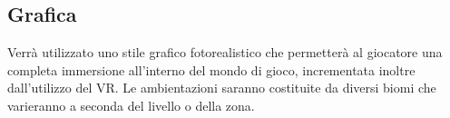 \documentclass[12pt]{report}
\begin{document}
% 
% 

\subsection{Grafica}
Verr\`a utilizzato uno stile grafico fotorealistico che permetter\`a al giocatore una completa immersione all'interno del mondo di gioco, incrementata inoltre dall'utilizzo del VR.
Le ambientazioni saranno costituite da diversi biomi che varieranno a seconda del livello o della zona.



\end{document}
